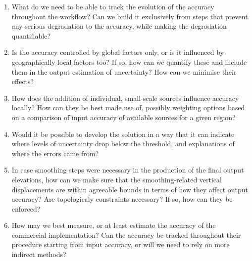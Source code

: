 \begin{enumerate}
\begin{enumerate}
        \item What do we need to be able to track the evolution of the accuracy throughout the workflow? Can we build it exclusively from steps that prevent any serious degradation to the accuracy, while making the degradation quantifiable?
        \item Is the accuracy controlled by global factors only, or is it influenced by geographically local factors too? If so, how can we quantify these and include them in the output estimation of uncertainty? How can we minimise their effects?
        \item How does the addition of individual, small-scale sources influence accuracy locally? How can they be best made use of, possibly weighting options based on a comparison of input accuracy of available sources for a given region?
        \item Would it be possible to develop the solution in a way that it can indicate where levels of uncertainty drop below the threshold, and explanations of where the errors came from?
        \item In case smoothing steps were necessary in the production of the final output elevations, how can we make sure that the smoothing-related vertical displacements are within agreeable bounds in terms of how they affect output accuracy? Are topologicaly constraints necessary? If so, how can they be enforced?
        \item How may we best measure, or at least estimate the accuracy of the commercial implementation? Can the accuracy be tracked throughout their procedure starting from input accuracy, or will we need to rely on more indirect methods?
    \end{enumerate}
\end{enumerate}